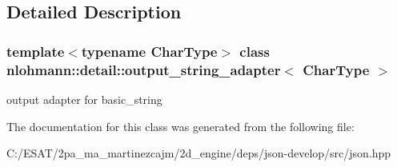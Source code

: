 \subsection{Detailed Description}
\subsubsection*{template$<$typename Char\+Type$>$\newline
class nlohmann\+::detail\+::output\+\_\+string\+\_\+adapter$<$ Char\+Type $>$}

output adapter for basic\+\_\+string 

The documentation for this class was generated from the following file\+:\begin{DoxyCompactItemize}
\item 
C\+:/\+E\+S\+A\+T/2pa\+\_\+ma\+\_\+martinezcajm/2d\+\_\+engine/deps/json-\/develop/src/json.\+hpp\end{DoxyCompactItemize}
